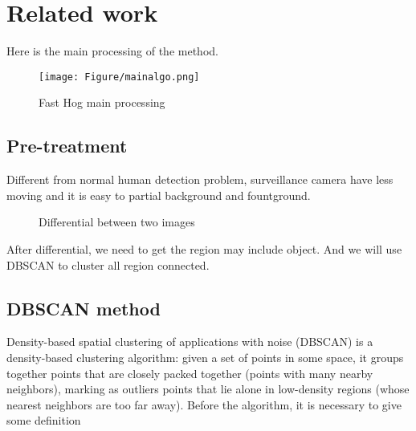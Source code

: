 \documentclass[12pt]{article}
\theoremstyle{plain}
\begin{document}
\section{Related work}
Here is the main processing of the method.

\begin{figure}[H]
\centering
\begin{minipage}[b]{0.9\textheight}
\texttt{[image: Figure/mainalgo.png]}
\end{minipage}
\caption{Fast Hog main processing}
\end{figure}

\subsection{Pre-treatment}
Different from normal human detection problem, surveillance camera have less moving and it is easy to partial background and fountground.

\begin{figure}[H]
\centering
{}
\caption{Differential between two images}
\end{figure}

After differential, we need to get the region may include object. And we will use DBSCAN to cluster all region connected.



\subsection{DBSCAN method}
Density-based spatial clustering of applications with noise (DBSCAN) is a density-based clustering algorithm: given a set of points in some space, it groups together points that are closely packed together (points with many nearby neighbors), marking as outliers points that lie alone in low-density regions (whose nearest neighbors are too far away). Before the algorithm, it is necessary to give some definition
\end{document}
